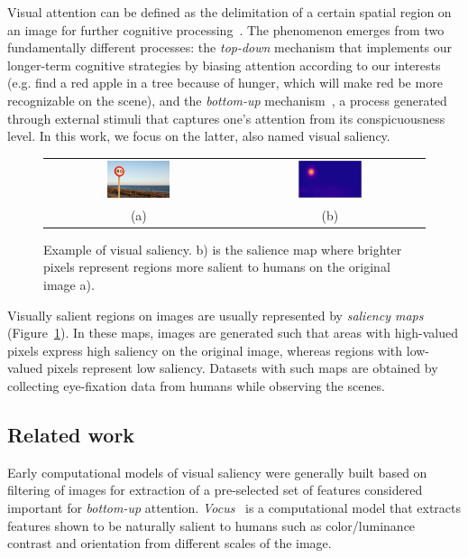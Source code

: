 \documentclass[12pt]{article}
\begin{document}
Visual attention can be defined as the delimitation of a certain spatial
region on an image for further cognitive processing~\cite{treisman_1980}.
The phenomenon emerges from two fundamentally different processes:
the \emph{top-down} mechanism that implements our longer-term cognitive strategies by biasing attention according to our interests (e.g. find a red apple in a tree because of hunger,
which will make red be more recognizable on the scene),
and the \emph{bottom-up} mechanism~\cite{colombini_2016}, a process generated through external stimuli
that captures one's attention from its conspicuousness level.
In this work, we focus on the latter, also named visual saliency.

\begin{figure}[H]
\begin{center}
		\begin{tabular} {cc}
		\includegraphics[width=0.35\textwidth]{./img/traffic_sign_s.jpg} &
		\includegraphics[width=0.35\textwidth]{./img/traffic_sign_m.jpg}\\
        (a) & (b)
		\end{tabular}
\end{center}
\caption{Example of visual saliency.
    b) is the salience map where brighter pixels represent regions more
    salient to humans on the original image a).}
\label{fig:example}
\end{figure}

Visually salient regions on images are usually represented by
\emph{saliency maps} (Figure~\ref{fig:example}). In these maps, images are generated such that
areas with high-valued pixels express high saliency on the original image,
whereas regions with low-valued pixels represent low saliency.
Datasets with such maps are obtained by collecting eye-fixation
data from humans while observing the scenes.

\subsection{Related work}
Early computational models of visual saliency were generally built based on
filtering of images for extraction of a pre-selected set of features
considered important for \emph{bottom-up} attention.
\emph{Vocus}~\cite{frintrop_2005} is a computational model that extracts
features shown to be naturally salient to humans such as color/luminance
contrast and orientation from different scales of the image.
\end{document}
